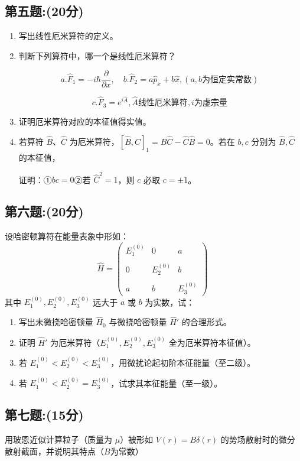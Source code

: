 \subsection{第五题:(20分)}
\begin{enumerate}
  \item 写出线性厄米算符的定义。
  
  \item 判断下列算符中，哪一个是线性厄米算符？
  
  $$ a. \hat{F}_1 = -i \hbar \frac{\partial}{\partial x}, \quad b. \hat{F}_2 = a \hat{p}_x + b \hat{x}, (a, b \text{为恒定实常数}) ~$$
  
  $$c. \hat{F}_3 = e^{i\hat A},\hat A \text{线性厄米算符}, i \text{为虚宗量}~$$
  
  \item 证明厄米算符对应的本征值得实值。
  
  \item 若算符 $\hat{B}$、$\hat{C}$ 为厄米算符，$[\hat{B}, \hat{C}]_1 = \hat{B} \hat{C} - \hat{C} \hat{B} = 0$。若在 $b, c$ 分别为 $\hat{B}, \hat{C}$ 的本征值，
  
  证明：①$ b c = 0$②若 $\hat{C}^2 = 1$，则 $c$ 必取 $c = \pm 1$。
\end{enumerate}
\subsection{第六题:(20分)}
设哈密顿算符在能量表象中形如：
\[\hat{H} = \begin{pmatrix}E_1^{(0)} & 0 & a \\\\0 & E_2^{(0)} & b \\\\a & b & E_3^{(0)}\end{pmatrix}~\]
其中 $E_1^{(0)}, E_2^{(0)}, E_3^{(0)}$ 远大于 $a$ 或 $b$ 为实数，试：
\begin{enumerate}
  \item 写出未微挠哈密顿量 $\hat{H}_0$ 与微挠哈密顿量 $\hat{H}'$ 的合理形式。
  
  \item 证明 $\hat{H}'$ 为厄米算符（$E_1^{(0)}, E_2^{(0)}, E_3^{(0)}$ 全为厄米算符本征值）。
  
  \item 若 $E_1^{(0)} < E_2^{(0)} < E_3^{(0)}$，用微扰论起初阶本征能量（至二级）。
  
  \item 若 $E_1^{(0)} < E_2^{(0)} = E_3^{(0)}$，试求其本征能量（至一级）。
\end{enumerate}
\subsection{第七题:(15分)}
用玻恩近似计算粒子（质量为 $\mu$）被形如 $V(r) = B \delta (r)$ 的势场散射时的微分散射截面，并说明其特点（$B$为常数）
